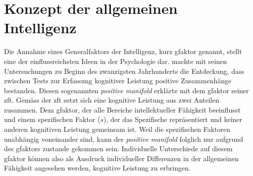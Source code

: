 \documentclass[11pt, twoside, a4paper]{book}		%
\begin{document}
\section{Konzept der allgemeinen Intelligenz}

Die Annahme eines Generalfaktors der Intelligenz, kurz \gls{gfaktor} genannt, stellt eine der einflussreichsten Ideen in der Psychologie dar. \citet{Spearman1904, Spearman1927} machte mit seinen Untersuchungen zu Beginn des zwanzigsten Jahrhunderts die Entdeckung, dass zwischen Tests zur Erfassung kognitiver Leistung positive Zusammenhänge bestanden. Diesen sogenannten \textit{positive man\-i\-fold} erklärte \citeauthor{Spearman1927} mit dem \gls{gfaktor} seiner \gls{zft}. Gemäss der \gls{zft} setzt sich eine kognitive Leistung aus zwei Anteilen zusammen. Dem \gls{gfaktor}, der alle Bereiche intellektueller Fähigkeit beeinflusst und einem spezifischen Faktor ($s$), der das Spezifische repräsentiert und keiner anderen kognitiven Leistung gemeinsam ist. Weil die spezifischen Faktoren unabhängig voneinander sind, kann der \textit{positive man\-i\-fold} folglich nur aufgrund des \gls{gfaktor}s zustande gekommen sein. Individuelle Unterschiede auf diesem \gls{gfaktor} können also als Ausdruck individueller Differenzen in der allgemeinen Fähigkeit angesehen werden, kognitive Leistung zu erbringen.
\end{document}
